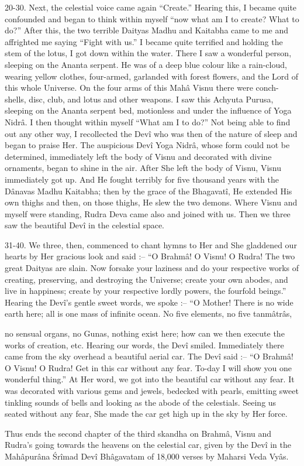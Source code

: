 20-30. Next, the celestial voice came again ``Create.'' Hearing this, I became quite confounded and began to think within myself ``now what am I to create? What to do?'' After this, the two terrible Daityas Madhu and Kaitabha came to me and affrighted me saying ``Fight with us.'' I became quite terrified and holding the stem of the lotus, I got down within the water. There I saw a wonderful person, sleeping on the Ananta serpent. He was of a deep blue colour like a rain-cloud, wearing yellow clothes, four-armed, garlanded with forest flowers, and the Lord of this whole Universe. On the four arms of this Mah\^a Visnu there were conch-shells, disc, club, and lotus and other weapons. I saw this Achyuta Purusa, sleeping on the Ananta serpent bed, motionless and under the influence of Yoga Nidr\^a. I then thought within myself ``What am I to do?'' Not being able to find out any other way, I recollected the Dev\^i who was then of the nature of sleep and began to praise Her. The auspicious Dev\^i Yoga Nidr\^a, whose form could not be determined, immediately left the body of Visnu and decorated with divine ornaments, began to shine in the air. After She left the body of Visnu, Visnu immediately got up. And He fought terribly for five thousand years with the D\^anavas Madhu Kaitabha; then by the grace of the Bhagavat\^i, He extended His own thighs and then, on those thighs, He slew the two demons. Where Visnu and myself were standing, Rudra Deva came also and joined with us. Then we three saw the beautiful Dev\^i in the celestial space.

31-40. We three, then, commenced to chant hymns to Her and She gladdened our hearts by Her gracious look and said :-- ``O Brahm\^a! O Visnu! O Rudra! The two great Daityas are slain. Now forsake your laziness and do your respective works of creating, preserving, and destroying the Universe; create your own abodes, and live in happiness; create by your respective lordly powers, the fourfold beings.'' Hearing the Dev\^i's gentle sweet words, we spoke :-- ``O Mother! There is no wide earth here; all is one mass of infinite ocean. No five elements, no five tanm\^atr\^as,

no sensual organs, no Gunas, nothing exist here; how can we then execute the works of creation, etc. Hearing our words, the Dev\^i smiled. Immediately there came from the sky overhead a beautiful aerial car. The Dev\^i said :-- ``O Brahm\^a! O Visnu! O Rudra! Get in this car without any fear. To-day I will show you one wonderful thing.'' At Her word, we got into the beautiful car without any fear. It was decorated with various gems and jewels, bedecked with pearls, emitting sweet tinkling sounds of bells and looking as the abode of the celestials. Seeing us seated without any fear, She made the car get high up in the sky by Her force.

Thus ends the second chapter of the third skandha on Brahm\^a, Visnu and Rudra's going towards the heavens on the celestial car, given by the Dev\^i in the Mah\^apur\^ana \'Sr\^imad Dev\^i Bh\^agavatam of 18,000 verses by Maharsi Veda Vy\^as.